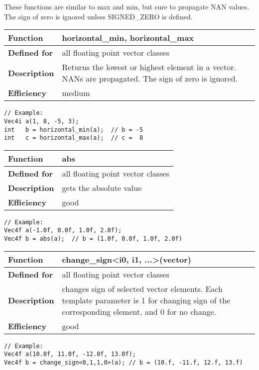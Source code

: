 \documentclass[vcl_manual.tex]{subfiles}
\begin{document}
These functions are similar to max and min, but sure to propagate NAN values.\\
The sign of zero is ignored unless SIGNED\_ZERO is defined.

\begin{tabular}{|p{25mm}|p{100mm}|}
\hline
\bfseries Function & horizontal\_min, horizontal\_max \\ \hline
\bfseries Defined for & all floating point vector classes \\ \hline
\bfseries Description & Returns the lowest or highest element in a vector.\newline
NANs are propagated. The sign of zero is ignored. \\ \hline
\bfseries Efficiency & medium \\ \hline
\end{tabular}
\begin{lstlisting}[frame=none]
// Example:
Vec4i a(1, 8, -5, 3);
int   b = horizontal_min(a);  // b = -5
int   c = horizontal_max(a);  // c =  8
\end{lstlisting}


\begin{tabular}{|p{25mm}|p{100mm}|}
\hline
\bfseries Function & abs \\ \hline
\bfseries Defined for & all floating point vector classes \\ \hline
\bfseries Description & gets the absolute value \\ \hline
\bfseries Efficiency & good \\ \hline
\end{tabular}
\begin{lstlisting}[frame=none]
// Example:
Vec4f a(-1.0f, 0.0f, 1.0f, 2.0f);
Vec4f b = abs(a);  // b = (1.0f, 0.0f, 1.0f, 2.0f)
\end{lstlisting}


\begin{tabular}{|p{25mm}|p{100mm}|}
\hline
\bfseries Function & change\_sign\textless i0, i1, ...\textgreater(vector) \\ \hline
\bfseries Defined for & all floating point vector classes \\ \hline
\bfseries Description & changes sign of selected vector elements.\newline
Each template parameter is 1 for changing sign of the corresponding element, and 0 for no change. \\ \hline
\bfseries Efficiency & good \\ \hline
\end{tabular}
\begin{lstlisting}[frame=none]
// Example:
Vec4f a(10.0f, 11.0f, -12.0f, 13.0f);
Vec4f b = change_sign<0,1,1,0>(a); // b = (10.f, -11.f, 12.f, 13.f)
\end{lstlisting}
\end{document}

